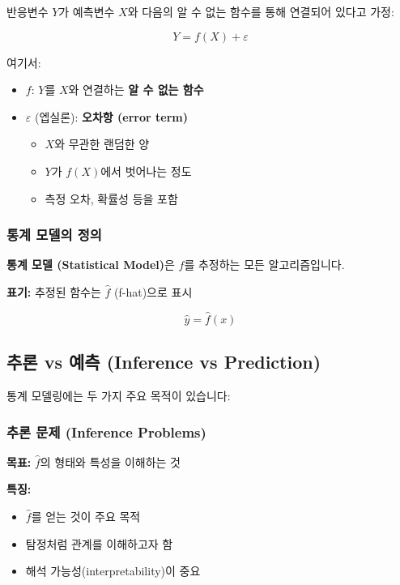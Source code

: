 \documentclass[12pt,a4paper]{article}
\begin{document}
반응변수 $Y$가 예측변수 $X$와 다음의 알 수 없는 함수를 통해 연결되어 있다고 가정:

\begin{equation}
Y = f(X) + \varepsilon
\end{equation}

여기서:
\begin{itemize}
    \item $f$: $Y$를 $X$와 연결하는 \textbf{알 수 없는 함수}
    \item $\varepsilon$ (엡실론): \textbf{오차항 (error term)}
    \begin{itemize}
        \item $X$와 무관한 랜덤한 양
        \item $Y$가 $f(X)$에서 벗어나는 정도
        \item 측정 오차, 확률성 등을 포함
    \end{itemize}
\end{itemize}

\subsubsection{통계 모델의 정의}

\textbf{통계 모델 (Statistical Model)}은 $f$를 추정하는 모든 알고리즘입니다.

\textbf{표기:} 추정된 함수는 $\hat{f}$ (f-hat)으로 표시

\begin{equation}
\hat{y} = \hat{f}(x)
\end{equation}

\subsection{추론 vs 예측 (Inference vs Prediction)}

통계 모델링에는 두 가지 주요 목적이 있습니다:

\subsubsection{추론 문제 (Inference Problems)}

\textbf{목표:} $\hat{f}$의 형태와 특성을 이해하는 것

\textbf{특징:}
\begin{itemize}
    \item $\hat{f}$를 얻는 것이 주요 목적
    \item 탐정처럼 관계를 이해하고자 함
    \item 해석 가능성(interpretability)이 중요
\end{itemize}
\end{document}

